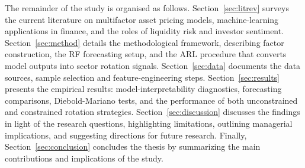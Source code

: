 The remainder of the study is organised as follows.  Section~\ref{sec:litrev} surveys the current literature on multifactor asset pricing models, machine-learning applications in finance, and the roles of liquidity risk and investor sentiment.  Section~\ref{sec:method} details the methodological framework, describing factor construction, the RF forecasting setup, and the ARL procedure that converts model outputs into sector rotation signals.  Section~\ref{sec:data} documents the data sources, sample selection and feature-engineering steps. Section~\ref{sec:results} presents the empirical results: model-interpretability diagnostics, forecasting comparisons, Diebold-Mariano tests, and the performance of both unconstrained and constrained rotation strategies. Section~\ref{sec:discussion} discusses the findings in light of the research questions, highlighting limitations, outlining managerial implications, and suggesting directions for future research. Finally, Section~\ref{sec:conclusion} concludes the thesis by summarizing the main contributions and implications of the study. 
